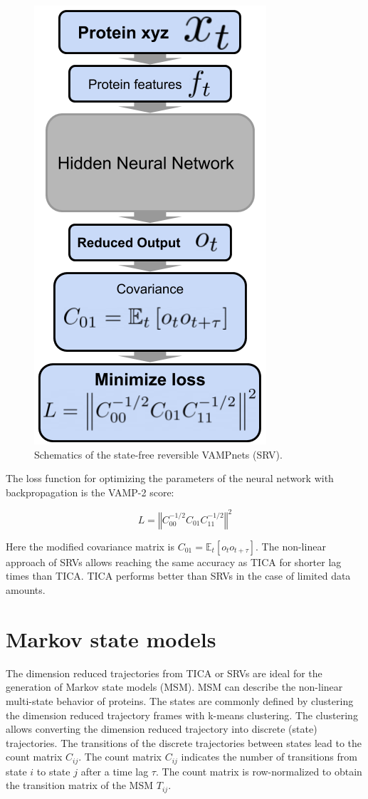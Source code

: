 \begin{figure}[H]
  \centering
  \includegraphics[width=0.4\linewidth]{figures3/NN.png}
  \caption{Schematics of the state-free reversible VAMPnets (SRV).}
  \label{fig:NN}
\end{figure}


The loss function for optimizing the parameters of the neural network with backpropagation is the VAMP-2 score:

$$L=\left\Vert C_{00}^{-1/2}C_{01}C_{11}^{-1/2}\right\Vert ^{2}$$

Here the modified covariance matrix is $C_{01}=\ensuremath{\mathbb{E}}_{t}\left[o_{t}o_{t+\tau}\right]$.
The non-linear approach of SRVs allows reaching the same accuracy as TICA for shorter lag times than TICA. TICA performs better than SRVs in the case of limited data amounts.

\section{Markov state models}

The dimension reduced trajectories from TICA or SRVs are ideal for the generation of Markov state models (MSM)\cite{Noe2015}. MSM can describe the non-linear multi-state behavior of proteins. The states are commonly defined by clustering the dimension reduced trajectory frames with k-means clustering. The clustering allows converting the dimension reduced trajectory into discrete (state) trajectories. The transitions of the discrete trajectories between states lead to the count matrix $C_{ij}$. The count matrix $C_{ij}$ indicates the number of transitions from state $i$ to state $j$ after a time lag $\tau$. The count matrix is row-normalized to obtain the transition matrix of the MSM $T_{ij}$.

